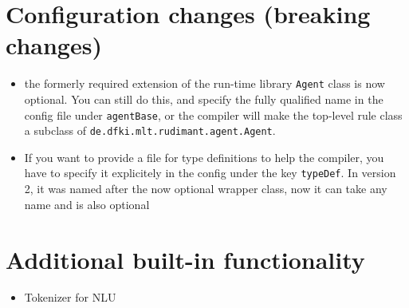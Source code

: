 \documentclass[a4paper]{report}
\begin{document}
\section*{Configuration changes (breaking changes)}
\begin{itemize}
\item the formerly required extension of the run-time library
  \texttt{Agent} class is now optional. You can still do this, and
  specify the fully qualified name in the config file under
  \texttt{agentBase}, or the compiler will make the top-level rule
  class a subclass of \texttt{de.dfki.mlt.rudimant.agent.Agent}.
\item If you want to provide a file for type definitions to help the
  compiler, you have to specify it explicitely in the config under the
  key \texttt{typeDef}. In version 2, it was named after the now
  optional wrapper class, now it can take any name and is also optional
\end{itemize}
\section*{Additional built-in functionality}
\begin{itemize}
\item Tokenizer for NLU
\end{itemize}



\end{document}

